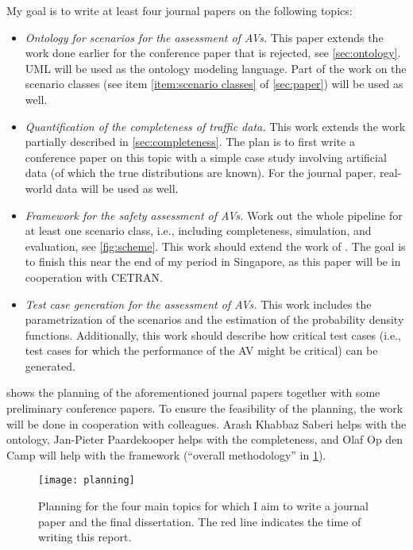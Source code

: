 My goal is to write at least four journal papers on the following topics:
\begin{itemize}
	\item \emph{Ontology for scenarios for the assessment of AVs.} This paper extends the work done earlier for the conference paper that is rejected, see \cref{sec:ontology}. UML will be used as the ontology modeling language. Part of the work on the scenario classes (see item \ref{item:scenario classes} of \cref{sec:paper}) will be used as well.
	\item \emph{Quantification of the completeness of traffic data.} This work extends the work partially described in \cref{sec:completeness}. The plan is to first write a conference paper on this topic with a simple case study involving artificial data (of which the true distributions are known). For the journal paper, real-world data will be used as well.
	\item \emph{Framework for the safety assessment of AVs.} Work out the whole pipeline for at least one scenario class, i.e., including completeness, simulation, and evaluation, see \cref{fig:scheme}. This work should extend the work of \cite{ploeg2018cetran}. The goal is to finish this near the end of my period in Singapore, as this paper will be in cooperation with CETRAN.
	\item \emph{Test case generation for the assessment of AVs.} This work includes the parametrization of the scenarios and the estimation of the probability density functions. Additionally, this work should describe how critical test cases (i.e., test cases for which the performance of the AV might be critical) can be generated.
\end{itemize}

 shows the planning of the aforementioned journal papers together with some preliminary conference papers. To ensure the feasibility of the planning, the work will be done in cooperation with colleagues. Arash Khabbaz Saberi helps with the ontology, Jan-Pieter Paardekooper helps with the completeness, and Olaf Op den Camp will help with the framework (``overall methodology'' in \cref{fig:planning}). 

\begin{figure}
	\centering
	\texttt{[image: planning]}
	\caption{Planning for the four main topics for which I aim to write a journal paper and the final dissertation. The red line indicates the time of writing this report.}
	\label{fig:planning}
\end{figure}


